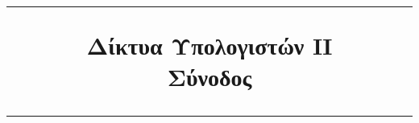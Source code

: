 

\ifdefined\isfirstsession

\else

\fi

\title{%
  \vspace{0.3cm}%
  \hrule height 2pt%
  \vspace{0.3cm} Δίκτυα Υπολογιστών ΙΙ\\
  \Sessionnumber{} Σύνοδος%
  \vspace{0.3cm}%
  \hrule height 2pt%
  \vspace{0.3cm}
}


\deactivateBG
\maketitle
\tableofcontents
\listoffigures
\clearpage %
\activateBG
{}
\setcounter{page}{1}





